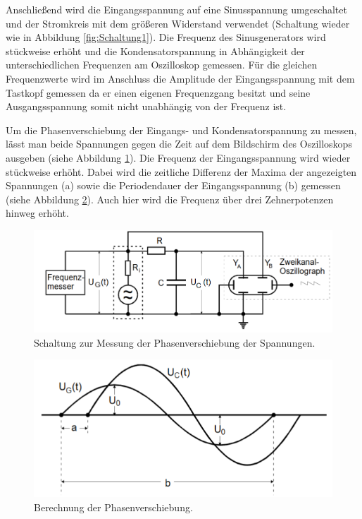 Anschließend wird die Eingangsspannung auf eine Sinusspannung umgeschaltet und der Stromkreis mit dem größeren Widerstand verwendet
(Schaltung wieder wie in Abbildung \ref{fig:Schaltung1}).
Die Frequenz des Sinusgenerators wird stückweise erhöht und die Kondensatorspannung in Abhängigkeit
der unterschiedlichen Frequenzen am Oszilloskop gemessen. Für die gleichen
Frequenzwerte wird im Anschluss die Amplitude der Eingangsspannung mit dem Tastkopf
gemessen da er einen eigenen Frequenzgang besitzt und seine Ausgangsspannung somit
nicht unabhängig von der Frequenz ist.

Um die Phasenverschiebung der Eingangs- und Kondensatorspannung zu messen,
lässt man beide Spannungen gegen die Zeit auf dem Bildschirm des Oszilloskops ausgeben (siehe Abbildung \ref{fig:Schaltung3}).
Die Frequenz der Eingangsspannung wird wieder stückweise erhöht. Dabei wird
die zeitliche Differenz der Maxima der angezeigten Spannungen (a) sowie die Periodendauer der Eingangsspannung (b)
gemessen (siehe Abbildung \ref{fig:Rechnung}).
Auch hier wird die Frequenz über drei Zehnerpotenzen hinweg erhöht.

\begin{figure}[H]
  \centering
  \includegraphics[width=14cm]{Schaltung3.PNG}
  \caption{Schaltung zur Messung der Phasenverschiebung der Spannungen. \cite{sample}}
  \label{fig:Schaltung3}
\end{figure}

\begin{figure}[H]
  \centering
  \includegraphics[width=14cm]{Rechnung.PNG}
  \caption{Berechnung der Phasenverschiebung. \cite{sample2}}
  \label{fig:Rechnung}
\end{figure}
